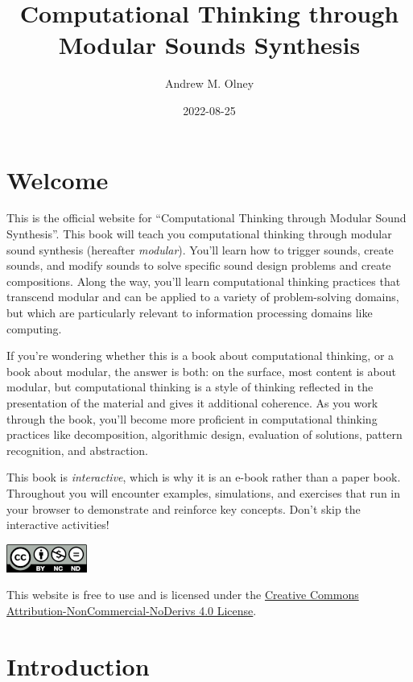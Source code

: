 \documentclass[
]{book}
\title{Computational Thinking through Modular Sounds Synthesis}
\author{Andrew M. Olney}
\date{2022-08-25}
\begin{document}
\maketitle

{
\hypersetup{linkcolor=}
\setcounter{tocdepth}{1}
\tableofcontents
}
\hypertarget{welcome}{%
\chapter*{Welcome}\label{welcome}}

This is the official website for ``Computational Thinking through Modular Sound Synthesis''. This book will teach you computational thinking through modular sound synthesis (hereafter \emph{modular}). You'll learn how to trigger sounds, create sounds, and modify sounds to solve specific sound design problems and create compositions. Along the way, you'll learn computational thinking practices that transcend modular and can be applied to a variety of problem-solving domains, but which are particularly relevant to information processing domains like computing.

If you're wondering whether this is a book about computational thinking, or a book about modular, the answer is both: on the surface, most content is about modular, but computational thinking is a style of thinking reflected in the presentation of the material and gives it additional coherence. As you work through the book, you'll become more proficient in computational thinking practices like decomposition, algorithmic design, evaluation of solutions, pattern recognition, and abstraction.

This book is \emph{interactive}, which is why it is an e-book rather than a paper book. Throughout you will encounter examples, simulations, and exercises that run in your browser to demonstrate and reinforce key concepts. Don't skip the interactive activities!

\includegraphics{images/by-nc-nd.png}

This website is free to use and is licensed under the \href{https://creativecommons.org/licenses/by-nc-nd/4.0/}{Creative Commons Attribution-NonCommercial-NoDerivs 4.0 License}.

\hypertarget{introduction}{%
\chapter{Introduction}\label{introduction}}
\end{document}
